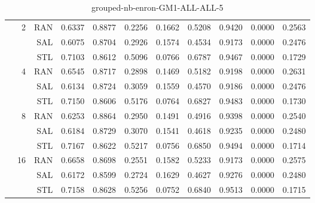 \begin{center}
\begin{table}[htbp]
\begin{center}
\begin{tabular}{ | r | r | r | r | r | r | r | r | r | r | r |}
 & \multirow{3}{*}{2} & RAN & 0.6337 & 0.8877 & 0.2256 & 0.1662 & 0.5208 & 0.9420 & 0.0000 & 0.2563\\ \cline{3-11}
 &   & SAL & 0.6075 & 0.8704 & 0.2926 & 0.1574 & 0.4534 & 0.9173 & 0.0000 & 0.2476\\ \cline{3-11}
 &   & STL & 0.7103 & 0.8612 & 0.5096 & 0.0766 & 0.6787 & 0.9467 & 0.0000 & 0.1729\\ \cline{2-11}
 & \multirow{3}{*}{4} & RAN & 0.6545 & 0.8717 & 0.2898 & 0.1469 & 0.5182 & 0.9198 & 0.0000 & 0.2631\\ \cline{3-11}
 &   & SAL & 0.6134 & 0.8724 & 0.3059 & 0.1559 & 0.4570 & 0.9186 & 0.0000 & 0.2476\\ \cline{3-11}
 &   & STL & 0.7150 & 0.8606 & 0.5176 & 0.0764 & 0.6827 & 0.9483 & 0.0000 & 0.1730\\ \cline{2-11}
 & \multirow{3}{*}{8} & RAN & 0.6253 & 0.8864 & 0.2950 & 0.1491 & 0.4916 & 0.9398 & 0.0000 & 0.2540\\ \cline{3-11}
 &   & SAL & 0.6184 & 0.8729 & 0.3070 & 0.1541 & 0.4618 & 0.9235 & 0.0000 & 0.2480\\ \cline{3-11}
 &   & STL & 0.7167 & 0.8622 & 0.5217 & 0.0756 & 0.6850 & 0.9494 & 0.0000 & 0.1714\\ \cline{2-11}
 & \multirow{3}{*}{16} & RAN & 0.6658 & 0.8698 & 0.2551 & 0.1582 & 0.5233 & 0.9173 & 0.0000 & 0.2575\\ \cline{3-11}
 &   & SAL & 0.6172 & 0.8599 & 0.2724 & 0.1629 & 0.4627 & 0.9276 & 0.0000 & 0.2480\\ \cline{3-11}
 &   & STL & 0.7158 & 0.8628 & 0.5256 & 0.0752 & 0.6840 & 0.9513 & 0.0000 & 0.1715\\ \cline{2-11}
\hline
\end{tabular}
\caption{grouped-nb-enron-GM1-ALL-ALL-5}
\end{center}
 \end{table}
\end{center}

